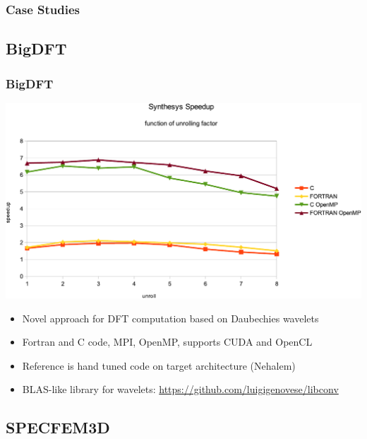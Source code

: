 \documentclass{beamer}
\begin{document}
\begin{frame}
\frametitle{Case Studies}
\end{frame}

\subsection{BigDFT}

\begin{frame}
  \frametitle{BigDFT}
  \begin{center}
    \includegraphics[scale=0.35]{Res_synthesis}
  \end{center}

 \begin{itemize}
  \item Novel approach for DFT computation based on Daubechies wavelets
  \item Fortran and C code, MPI, OpenMP, supports CUDA and OpenCL
  \item Reference is hand tuned code on target architecture (Nehalem)
  \item BLAS-like library for wavelets: \url{https://github.com/luigigenovese/libconv}
  \end{itemize}
\end{frame}

\subsection{SPECFEM3D}
\end{document}
